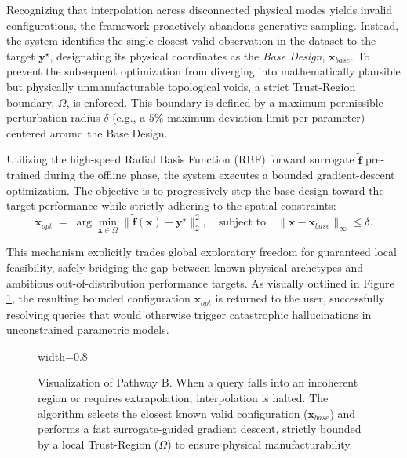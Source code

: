 \begin{enumerate}
    Recognizing that interpolation across disconnected physical modes yields invalid configurations, the framework proactively abandons generative sampling. Instead, the system identifies the single closest valid observation in the dataset to the target $\mathbf{y}^\star$, designating its physical coordinates as the \textit{Base Design}, $\mathbf{x}_{base}$. To prevent the subsequent optimization from diverging into mathematically plausible but physically unmanufacturable topological voids, a strict Trust-Region boundary, $\Omega$, is enforced. This boundary is defined by a maximum permissible perturbation radius $\delta$ (e.g., a $5\%$ maximum deviation limit per parameter) centered around the Base Design.
    
    Utilizing the high-speed Radial Basis Function (RBF) forward surrogate $\tilde{\mathbf{f}}$ pre-trained during the offline phase, the system executes a bounded gradient-descent optimization. The objective is to progressively step the base design toward the target performance while strictly adhering to the spatial constraints:
    \begin{equation}
        \mathbf{x}_{opt} \;=\; \arg\min_{\mathbf{x} \in \Omega} \big\| \tilde{\mathbf{f}}(\mathbf{x}) - \mathbf{y}^\star \big\|_2^2, \quad \text{subject to} \quad \|\mathbf{x} - \mathbf{x}_{base}\|_\infty \le \delta.
        \label{eq:pathway_b_opt}
    \end{equation}
    
    
    This mechanism explicitly trades global exploratory freedom for guaranteed local feasibility, safely bridging the gap between known physical archetypes and ambitious out-of-distribution performance targets. As visually outlined in Figure \ref{fig:trust_region_opt}, the resulting bounded configuration $\mathbf{x}_{opt}$ is returned to the user, successfully resolving queries that would otherwise trigger catastrophic hallucinations in unconstrained parametric models.

        \begin{figure}[htbp]
            \centering
            \begin{adjustbox}{width=0.8\linewidth}
              
          \end{adjustbox}
            \caption[Pathway B: Surrogate-Assisted Trust-Region Optimization]{Visualization of Pathway B. When a query falls into an incoherent region or requires extrapolation, interpolation is halted. The algorithm selects the closest known valid configuration ($\mathbf{x}_{base}$) and performs a fast surrogate-guided gradient descent, strictly bounded by a local Trust-Region ($\Omega$) to ensure physical manufacturability.}
            \label{fig:trust_region_opt}
        \end{figure}

\end{enumerate}



